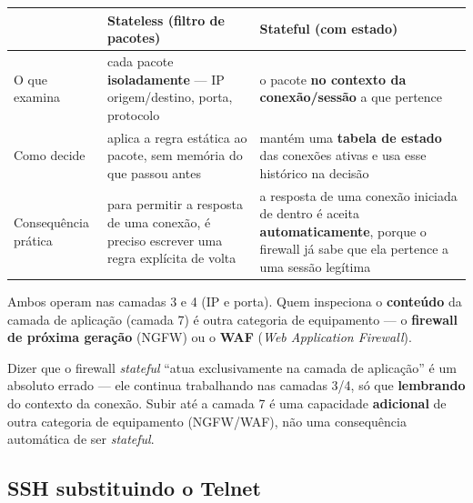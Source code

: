 \begin{conceito}
\begin{center}
\begin{tabular}{@{}p{2.4cm}p{4.6cm}p{4.6cm}@{}}
\toprule
& \textbf{Stateless} (filtro de pacotes) & \textbf{Stateful} (com estado) \\
\midrule
O que examina & cada pacote \textbf{isoladamente} --- IP origem/destino,
porta, protocolo & o pacote \textbf{no contexto da conexão/sessão} a que
pertence \\
Como decide & aplica a regra estática ao pacote, sem memória do que passou
antes & mantém uma \textbf{tabela de estado} das conexões ativas e usa esse
histórico na decisão \\
Consequência prática & para permitir a resposta de uma conexão, é preciso
escrever uma regra explícita de volta & a resposta de uma conexão iniciada
de dentro é aceita \textbf{automaticamente}, porque o firewall já sabe que
ela pertence a uma sessão legítima \\
\bottomrule
\end{tabular}
\end{center}
Ambos operam nas camadas 3 e 4 (IP e porta). Quem inspeciona o
\textbf{conteúdo} da camada de aplicação (camada 7) é outra categoria de
equipamento --- o \textbf{firewall de próxima geração} (NGFW) ou o
\textbf{WAF} (\textit{Web Application Firewall}).
\end{conceito}

\begin{cuidado}
Dizer que o firewall \textit{stateful} “atua exclusivamente na camada de
aplicação” é um absoluto errado --- ele continua trabalhando nas camadas
3/4, só que \textbf{lembrando} do contexto da conexão. Subir até a camada 7
é uma capacidade \textbf{adicional} de outra categoria de equipamento
(NGFW/WAF), não uma consequência automática de ser \textit{stateful}.
\end{cuidado}

\subsection{SSH substituindo o Telnet}

